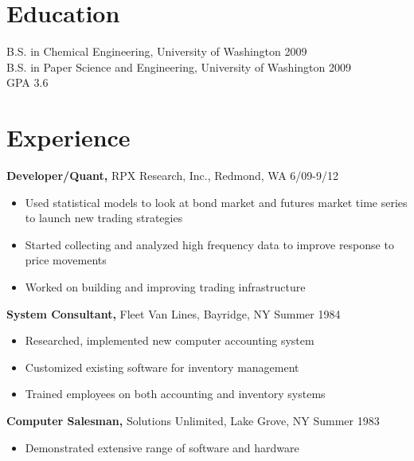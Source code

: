 \documentclass[margin]{res}
\begin{document}
 
 
 
\begin{resume} 
 
\section{Education} 
B.S. in Chemical Engineering, University of Washington 2009 \\
B.S. in Paper Science and Engineering, University of Washington 2009\\
GPA 3.6 
 
\section{Experience}
 {\bf Developer/Quant,} RPX Research, Inc., Redmond, WA \hfill 6/09-9/12
 \begin{itemize} \itemsep -2pt  %
 \item Used statistical models to look at bond market and futures market time series to launch new trading strategies 
 \item Started collecting and analyzed high frequency data to improve response to price movements
 \item Worked on building and improving trading infrastructure
 \end{itemize}

 
 
{\bf System Consultant,} Fleet Van Lines, Bayridge, NY \hfill  Summer 1984
\begin{itemize} \itemsep -2pt %
\item Researched, implemented new computer accounting 
                 system 
\item Customized existing software for inventory 
                 management 
\item Trained employees on both accounting and inventory 
                 systems 
\end{itemize}

{\bf Computer Salesman,} Solutions Unlimited, Lake Grove, NY \hfill
Summer 1983                
                \begin{itemize} \itemsep -2pt
                 \item  Demonstrated extensive range of software and 
                 hardware 
                

\end{itemize}
\end{resume}
\end{document}
